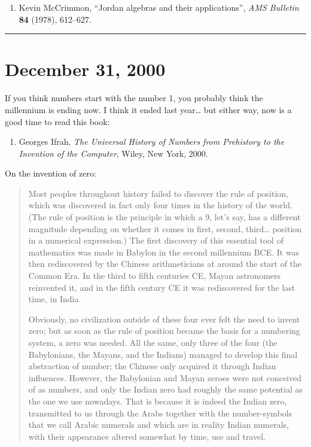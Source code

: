 \documentclass{article}
\def\tightlist{}
\begin{document}
\begin{enumerate}
\def\labelenumi{\arabic{enumi})}
\setcounter{enumi}{23}
\tightlist
\item
  Kevin McCrimmon, ``Jordan algebras and their applications'', \emph{AMS
  Bulletin} \textbf{84} (1978), 612--627.
\end{enumerate}

\begin{center}\rule{0.5\linewidth}{0.5pt}\end{center}



\hypertarget{week163}{%
\section{December 31, 2000}\label{week163}}

If you think numbers start with the number 1, you probably think the
millennium is ending now. I think it ended last year\ldots{} but either
way, now is a good time to read this book:

\begin{enumerate}
\def\labelenumi{\arabic{enumi})}
\tightlist
\item
  Georges Ifrah, \emph{The Universal History of Numbers from Prehistory
  to the Invention of the Computer}, Wiley, New York, 2000.
\end{enumerate}

On the invention of zero:

\begin{quote}
Most peoples throughout history failed to discover the rule of position,
which was discovered in fact only four times in the history of the
world. (The rule of position is the principle in which a 9, let's say,
has a different magnitude depending on whether it comes in first,
second, third\ldots{} position in a numerical expression.) The first
discovery of this essential tool of mathematics was made in Babylon in
the second millennium BCE. It was then rediscovered by the Chinese
arithmeticians at around the start of the Common Era. In the third to
fifth centuries CE, Mayan astronomers reinvented it, and in the fifth
century CE it was rediscovered for the last time, in India.

Obviously, no civilization outside of these four ever felt the need to
invent zero; but as soon as the rule of position became the basis for a
numbering system, a zero was needed. All the same, only three of the
four (the Babylonians, the Mayans, and the Indians) managed to develop
this final abstraction of number; the Chinese only acquired it through
Indian influences. However, the Babylonian and Mayan zeroes were not
conceived of as numbers, and only the Indian zero had roughly the same
potential as the one we use nowadays. That is because it is indeed the
Indian zero, transmitted to us through the Arabs together with the
number-symbols that we call Arabic numerals and which are in reality
Indian numerals, with their appearance altered somewhat by time, use and
travel.
\end{quote}
\end{document}
